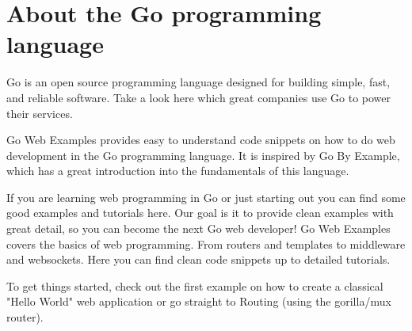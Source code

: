 \section{About the Go programming language}

Go is an open source programming language designed for building simple, fast, and reliable software. Take a look here which great companies use Go to power their services.

Go Web Examples provides easy to understand code snippets on how to do web development in the Go programming language. It is inspired by Go By Example, which has a great introduction into the fundamentals of this language.

If you are learning web programming in Go or just starting out you can find some good examples and tutorials here. Our goal is it to provide clean examples with great detail, so you can become the next Go web developer! Go Web Examples covers the basics of web programming. From routers and templates to middleware and websockets. Here you can find clean code snippets up to detailed tutorials.

To get things started, check out the first example on how to create a classical "Hello World" web application or go straight to Routing (using the gorilla/mux router).

